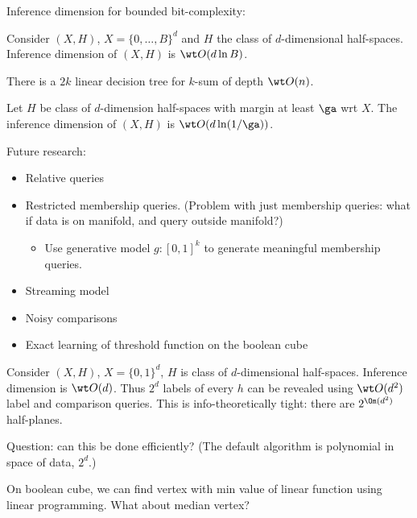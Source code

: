 Inference dimension for bounded bit-complexity: 
\begin{thm}
Consider $(X,H)$, $X=\{0,\ldots, B\}^d$ and $H$ the class of $d$-dimensional half-spaces. 
Inference dimension of $(X,H)$ is $\wt O(d\ln B)$.
\end{thm}
\begin{cor}
There is a $2k$ linear decision tree for $k$-sum of depth $\wt O(n)$. 
\end{cor}

\begin{thm}
Let $H$ be class of $d$-dimension half-spaces with margin at least $\ga$ wrt $X$.
The inference dimension of $(X,H)$ is $\wt O(d\ln (1/\ga))$.
\end{thm}

Future research:
\begin{itemize}
\item
Relative queries
\item
Restricted membership queries.  (Problem with just membership queries: what if data is on manifold, and query outside manifold?)
\begin{itemize}
\item
Use generative model $g:[0,1]^k$ to generate meaningful membership queries. %
\end{itemize}
\item
Streaming model
\item
Noisy comparisons
\item 
Exact learning of threshold function on the boolean cube
\end{itemize}

Consider $(X,H)$, $X=\{0,1\}^d$, $H$ is class of $d$-dimensional half-spaces. Inference dimension is $\wt O(d)$. Thus $2^d$ labels of every $h$ can be revealed using $\wt O(d^2)$ label and comparison queries. This is info-theoretically tight: there are $2^{\Om(d^2)}$ half-planes.

Question: can this be done efficiently?
(The default algorithm is polynomial in space of data, $2^d$.)

On boolean cube, we can find vertex with min value of linear function using linear programming. What about median vertex?


